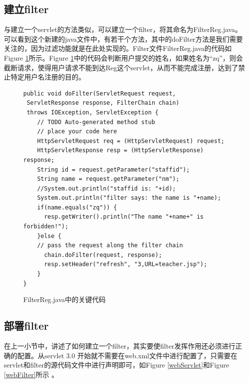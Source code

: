 \subsection{建立filter}
与建立一个servlet的方法类似，可以建立一个filter，将其命名为FilterReg.java。可以看到这个新建的java文件中，有若干个方法，其中的doFilter方法是我们需要关注的，因为过滤功能就是在此处实现的。Filter文件FilterReg.java的代码如Figure \ref{filterReg}所示。Figure \ref{filterReg}中的代码会判断用户提交的姓名，如果姓名为“zq”，则会截断请求，使得用户请求不能到达Reg这个servlet，从而不能完成注册，达到了禁止特定用户名注册的目的。
\begin{figure}
\begin{lstlisting}
public void doFilter(ServletRequest request, 
 ServletResponse response, FilterChain chain)
 throws IOException, ServletException {
	// TODO Auto-generated method stub
	// place your code here
	HttpServletRequest req = (HttpServletRequest) request; 
	HttpServletResponse resp = (HttpServletResponse) response;
	String id = request.getParameter("staffid");
	String name = request.getParameter("nm");
	//System.out.println("staffid is: "+id);
	System.out.println("filter says: the name is "+name);
	if(name.equals("zq")) {
	  resp.getWriter().println("The name "+name+" is forbidden!");
	}else {
	// pass the request along the filter chain
	  chain.doFilter(request, response);
	  resp.setHeader("refresh", "3,URL=teacher.jsp");
	}
}
\end{lstlisting}
\caption{FilterReg.java中的关键代码}
\label{filterReg}
\end{figure}
\subsection{部署filter}
在上一小节中，讲述了如何建立一个filter，其实要使filter发挥作用还必须进行正确的配置。从servlet 3.0 开始就不需要在web.xml文件中进行配置了，只需要在servlet和filter的源代码文件中进行声明即可，如Figure \ref{webServlet}和Figure \ref{webFilter}所示 。


